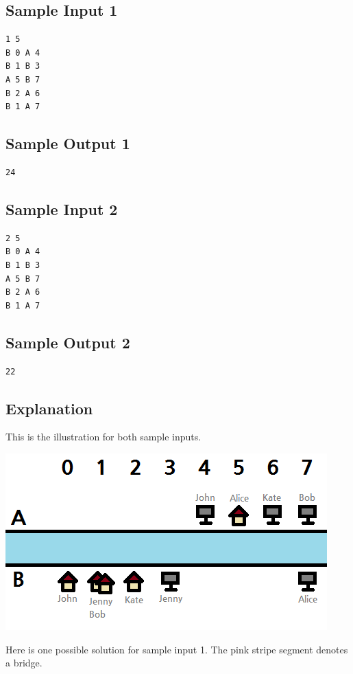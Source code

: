 \documentclass[a4paper]{article}
\begin{document}
\subsection*{Sample Input 1}
\begin{verbatim}
1 5
B 0 A 4
B 1 B 3
A 5 B 7
B 2 A 6
B 1 A 7
\end{verbatim}

\subsection*{Sample Output 1}
\begin{verbatim}
24
\end{verbatim}

\subsection*{Sample Input 2}
\begin{verbatim}
2 5
B 0 A 4
B 1 B 3
A 5 B 7
B 2 A 6
B 1 A 7
\end{verbatim}

\subsection*{Sample Output 2}
\begin{verbatim}
22
\end{verbatim}

\subsection*{Explanation}
This is the illustration for both sample inputs.

\begin{center}
\includegraphics{bridge/bridge_initial}
\end{center}

Here is one possible solution for sample input 1. The pink stripe segment denotes a bridge.
\end{document}
